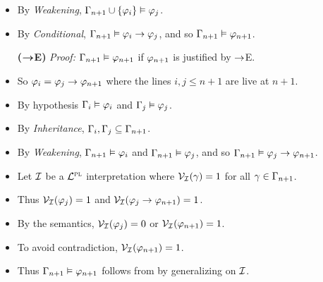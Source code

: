 \documentclass[a4paper, 11pt]{article} %
\begin{document}
\begin{itemize}
    \item By \textit{Weakening}, $\Gamma_{n+1}\cup\lbrace\varphi_i\rbrace\vDash\varphi_j$.
    \item By \textit{Conditional}, $\Gamma_{n+1}\vDash\varphi_i\rightarrow\varphi_j$, and so $\Gamma_{n+1}\vDash\varphi_{n+1}$.
  \item[\bf ($\boldsymbol{\rightarrow}$E)] \textit{Proof:} $\Gamma_{n+1} \vDash \varphi_{n+1}$ if $\varphi_{n+1}$ is justified by $\rightarrow$E.
    \item So $\varphi_i = \varphi_j \rightarrow \varphi_{n+1}$ where the lines $i,j \leq n+1$ are live at $n+1$. 
    \item By hypothesis $\Gamma_i\vDash \varphi_i$ and $\Gamma_j\vDash \varphi_j$.
    \item By \textit{Inheritance}, $\Gamma_i,\Gamma_j \subseteq \Gamma_{n+1}$.
    \item By \textit{Weakening}, $\Gamma_{n+1}\vDash\varphi_i$ and $\Gamma_{n+1}\vDash\varphi_j$, and so $\Gamma_{n+1}\vDash\varphi_j \rightarrow \varphi_{n+1}$.
    \item Let $\mathcal{I}$ be a $\mathcal{L}^{\textsc{pl}}$ interpretation where $\mathcal{V}_{\mathcal{I}}(\gamma) = 1$ for all $\gamma \in \Gamma_{n+1}$. 
    \item Thus $\mathcal{V}_{\mathcal{I}}(\varphi_j) = 1$ and $\mathcal{V}_{\mathcal{I}}(\varphi_j \rightarrow \varphi_{n+1}) = 1$.
    \item By the semantics, $\mathcal{V}_{\mathcal{I}}(\varphi_j) = 0$ or $\mathcal{V}_{\mathcal{I}}(\varphi_{n+1}) = 1$.
    \item To avoid contradiction, $\mathcal{V}_{\mathcal{I}}(\varphi_{n+1}) = 1$.
    \item Thus $\Gamma_{n+1}\vDash\varphi_{n+1}$ follows from by generalizing on $\mathcal{I}$.
\end{itemize}




%
\end{document}
